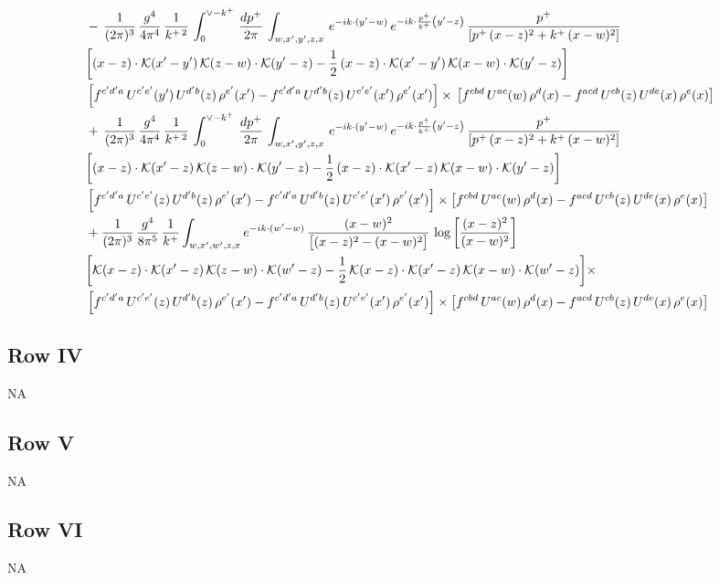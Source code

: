 \documentclass[9pt]{article}
\numberwithin{equation}{section}
\begin{document}
\begin{align}
&   -\,\frac{1}{(2\pi)^{3}}\,\frac{g^{4}}{4\pi^{4}}\,\frac{1}{k^{+\,2}}\,\int_{0}^{\vee-k^{+}}\, \frac{dp^{+}}{2\pi}\,\int_{w,x',y',z,x}\, e^{-ik\cdot (y'-w)}\,e^{-ik\cdot \frac{p^{+}}{k^{+}}\left(y'-z\right)}\, \frac{p^{+}}{\left[p^{+}\,(x-z)^{2}+k^{+}\,(x-w)^{2}\right]}\notag \\ & \bigg[(x-z)\cdot\mathcal{K}(x'-y')\,\mathcal{K}(z-w)\cdot\mathcal{K}(y'-z)-\frac{1}{2}\,(x-z)\cdot\mathcal{K}(x'-y')\,\mathcal{K}(x-w)\cdot\mathcal{K}(y'-z)\bigg]\notag \\ & \left[f^{c'd'a}\,U^{c'e'}(y')\,U^{d'b}(z)\,\rho^{e'}(x')-f^{c'd'a}\, U^{d'b}(z)\,U^{c'e'}(x')\,\rho^{e'}(x')\right]\times\, \left[f^{cbd}\,U^{ac}(w)\,\rho^{d}(x) -f^{acd}\,U^{cb}(z)\,U^{de}(x)\,\rho^{e}(x)\right]\notag \\ & +\,\frac{1}{(2\pi)^{3}}\,\frac{g^{4}}{4\pi^{4}}\,\frac{1}{k^{+\,2}}\,\int_{0}^{\vee-k^{+}}\, \frac{dp^{+}}{2\pi}\,\int_{w,x',y',z,x}\, e^{-ik\cdot (y'-w)}\,e^{-ik\cdot \frac{p^{+}}{k^{+}}\left(y'-z\right)}\, \frac{p^{+}}{\left[p^{+}\,(x-z)^{2}+k^{+}\,(x-w)^{2}\right]}\notag \\ &\bigg[(x-z)\cdot\mathcal{K}(x'-z)\,\mathcal{K}(z-w)\cdot\mathcal{K}(y'-z)-\frac{1}{2}\,(x-z)\cdot\mathcal{K}(x'-z)\,\mathcal{K}(x-w)\cdot\mathcal{K}(y'-z)\bigg]\notag \\ & \left[f^{c'd'a}\,U^{c'e'}(z)\,U^{d'b}(z)\,\rho^{e'}(x')-f^{c'd'a}\, U^{d'b}(z)\,U^{c'e'}(x')\,\rho^{e'}(x')\right]\times \left[f^{cbd}\,U^{ac}(w)\,\rho^{d}(x) -f^{acd}\,U^{cb}(z)\,U^{de}(x)\,\rho^{e}(x)\right] \notag \\ & +\frac{1}{(2\pi)^{3}}\,\frac{g^{4}}{8\pi^{5}}\,\frac{1}{k^{+}}\int_{w,x',w',z,x}e^{-ik\cdot(w'-w)}\,\frac{(x-w)^{2}}{\big[(x-z)^{2}-(x-w)^{2}\big]}\,\log\left[\frac{(x-z)^{2}}{(x-w)^{2}}\right]\notag \\ &  \bigg[\mathcal{K}(x-z)\cdot\mathcal{K}(x'-z)\,\mathcal{K}(z-w)\cdot\mathcal{K}(w'-z)-\frac{1}{2}\,\mathcal{K}(x-z)\cdot\mathcal{K}(x'-z)\,\mathcal{K}(x-w)\cdot\mathcal{K}(w'-z)\bigg]   \times\notag \\ & \left[f^{c'd'a}\,U^{c'e'}(z)\,U^{d'b}(z)\,\rho^{e'}(x')-f^{c'd'a}\, U^{d'b}(z)\,U^{c'e'}(x')\,\rho^{e'}(x')\right]\times \left[f^{cbd}\,U^{ac}(w)\,\rho^{d}(x) -f^{acd}\,U^{cb}(z)\,U^{de}(x)\,\rho^{e}(x)\right]
\end{align}
\subsection{Row IV}
\textsc{NA}
\subsection{Row V}
\textsc{NA}
\subsection{Row VI}
\textsc{NA}
\end{document}
